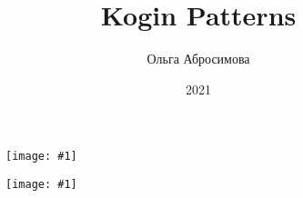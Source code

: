 \documentclass[12pt,twoside,openany,b5paper]{book}
\newcommand{\figp}[1]{
  \begin{figure}
  \begin{center}
  \texttt{[image: \#1]}
  \end{center}
  \end{figure}
}
\begin{document}
\title{Kogin Patterns}
\author{Ольга Абросимова}
\date{2021}
\maketitle

\figp{1}

\figp{2}
\end{document}
